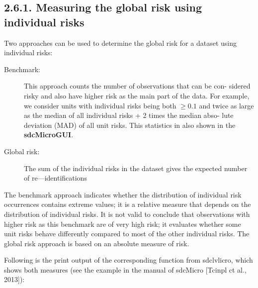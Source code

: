 \documentclass[]{article}
\begin{document}
\subsection*{2.6.1. Measuring the global risk using individual risks}
Two approaches can be used to determine the global risk for a dataset using
individual risks:
\begin{description}
\item[Benchmark:] This approach counts the number of observations that can be con-
sidered risky and also have higher risk as the main part of the data. For
example, we consider units with individual risks being both $\geq 0.1$ and twice
as large as the median of all individual risks + 2 times the median abso-
lute deviation (MAD) of all unit risks. This statistics in also shown in the
\textbf{sdcMicroGUI}.

\item[Global risk:] The sum of the individual risks in the dataset gives the expected
number of re—identiﬁcations

\end{description}
The benchmark approach indicates whether the distribution of individual risk
occurrences contains extreme values; it is a relative measure that depends on the
distribution of individual risks. It is not valid to conclude that observations with
higher risk as this benchmark are of very high risk; it evaluates whether some
unit risks behave differently compared to most of the other individual risks. The
global risk approach is based on an absolute measure of risk. 

Following is the print
output of the corresponding function from sdclvlicro, which shows both measures
(see the example in the manual of sdcMicro [Tcinpl ct al., 2013]):

\end{document}
